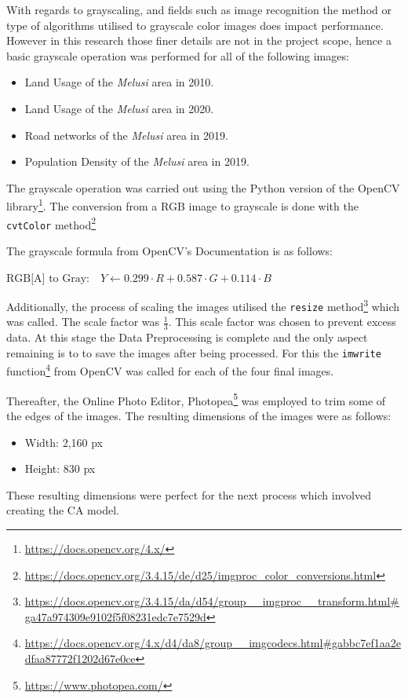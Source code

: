 With regards to grayscaling, and fields such as image recognition the method or type of algorithms utilised to grayscale color images does impact performance.\cite{gray} However in this research those finer details are not in the project scope, hence a basic grayscale operation was performed for all of the following images:
\begin{itemize}
\item Land Usage of the \textit{Melusi} area in 2010.
\item Land Usage of the \textit{Melusi} area in 2020.
\item Road networks of the \textit{Melusi} area in 2019.
\item Population Density of the \textit{Melusi} area in 2019.
\end{itemize}

The grayscale operation was carried out using the Python version of the OpenCV library\footnote{\url{https://docs.opencv.org/4.x/}}. The conversion from a RGB image to grayscale is done with the \texttt{cvtColor} method\footnote{\url{https://docs.opencv.org/3.4.15/de/d25/imgproc_color_conversions.html}}

The grayscale formula from OpenCV's Documentation is as follows:
\begin{center}
$\text{RGB[A] to Gray:} \quad Y \leftarrow 0.299 \cdot R + 0.587 \cdot G + 0.114 \cdot B$
\end{center}
Additionally, the process of scaling the images utilised the \texttt{resize} method\footnote{\url{https://docs.opencv.org/3.4.15/da/d54/group\_\_imgproc\_\_transform.html\#ga47a974309e9102f5f08231edc7e7529d}} which was called. The scale factor was $\frac{1}{3}$. This scale factor was chosen to prevent excess data. At this stage the Data Preprocessing is complete and the only aspect remaining is to to save the images after being processed. For this the \texttt{imwrite} function\footnote{\url{https://docs.opencv.org/4.x/d4/da8/group__imgcodecs.html\#gabbc7ef1aa2edfaa87772f1202d67e0ce}} from OpenCV was called for each of the four final images.

Thereafter, the Online Photo Editor, Photopea\footnote{\url{https://www.photopea.com/}} was employed to trim some of the edges of the images. The resulting dimensions of the images were as follows:
\begin{itemize}
\item Width: 2,160 px
\item Height: 830 px
\end{itemize}
These resulting dimensions were perfect for the next process which involved creating the CA model.
